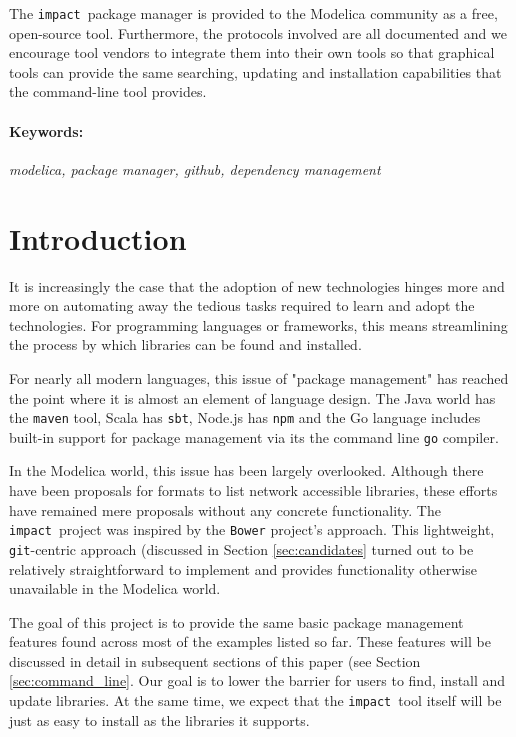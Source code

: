 \documentclass[11pt,a4paper,twocolumn]{article}
\newcommand{\impact}{\texttt{impact}} %
\newcommand{\code}[1]{\texttt{#1}} %
\begin{document}
The \impact\ package manager is provided to the Modelica community as a free,
open-source tool.  Furthermore, the protocols involved are all documented and
we encourage tool vendors to integrate them into their own tools so that
graphical tools can provide the same searching, updating and installation
capabilities that the command-line tool provides.

\paragraph{Keywords:}
\emph{modelica, package manager, github, dependency management}

\section{Introduction}
\label{sec:intro}

It is increasingly the case that the adoption of new technologies hinges more
and more on automating away the tedious tasks required to learn and adopt the
technologies.  For programming languages or frameworks, this means streamlining
the process by which libraries can be found and installed.

For nearly all modern languages, this issue of "package management" has reached
the point where it is almost an element of language design.  The Java world has 
the \code{maven} tool, Scala has \code{sbt}, Node.js has \code{npm} and the Go 
language includes built-in support for package management via its the command line 
\code{go} compiler.

In the Modelica world, this issue has been largely overlooked.  Although there
have been proposals for formats to list network accessible libraries, these 
efforts have remained mere proposals without any concrete functionality.  The
\impact\ project was inspired by the \code{Bower}\cite{Bower} project's approach.  
This lightweight, \code{git}-centric approach (discussed in Section
\ref{sec:candidates} turned out to be relatively straightforward to implement and 
provides functionality otherwise unavailable in the Modelica world.

The goal of this project is to provide the same basic package management features 
found across most of the examples listed so far.  These features will be discussed 
in detail in subsequent sections of this paper (see Section \ref{sec:command_line}.
Our goal is to lower the barrier for users to find, install and update libraries.  
At the same time, we expect that the \impact\ tool itself will be just as easy to 
install as the libraries it supports.
\end{document}
